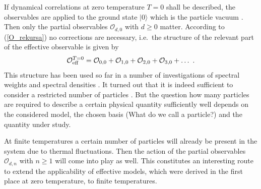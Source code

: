 If dynamical correlations at zero temperature $T=0$ shall be described,
the observables are applied to the ground state $|0\rangle$ which is
the particle vacuum \cite{heidb02b}. Then only the partial observables
 ${\mathcal O}_{d,0}$ with $d\ge0$ matter. According
to (\ref{O_rekursa}) no corrections are necessary, i.e.\
the structure of the relevant part of the effective observable
is given by
\begin{equation}
  \label{O_d0_extra}
  {\mathcal O}_{\rm eff}^{T=0}={\mathcal O}_{0,0}+{\mathcal
  O}_{1,0}+{\mathcal O}_{2,0}+{\mathcal O}_{3,0}+\ldots\ .
\end{equation}
This structure has been used so far in a number of investigations
of spectral weights \cite{singh99a,schmi03a} and spectral densities
\cite{knett01b,schmi01,zheng03a}. It turned out that it is indeed
sufficient to  consider a restricted number of particles 
\cite{knett01b,schmi01,schmi03a}. But the question how many particles
are required to describe a certain physical quantity sufficiently well 
depends on the considered model, the chosen basis (What do we call a particle?)
and the quantity under study.

At finite temperatures a certain number of particles will already be
present in the system due to thermal fluctuations. Then the action of
the partial observables ${\mathcal O}_{d,n}$ with $n\ge 1$ will
come into play as well. This constitutes an interesting route
to extend the applicability of effective models, which were derived
in the first place at zero temperature, to finite temperatures.


